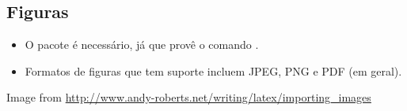 \documentclass{beamer}
\begin{document}
\subsection{Figuras}
\begin{frame}[fragile]{\insertsubsection}
\begin{itemize}
\item O pacote  é necessário, já que provê o comando
.
\item Formatos de figuras que tem suporte incluem JPEG, PNG e PDF (em geral). 
\end{itemize}

\tiny{Image from \url{http://www.andy-roberts.net/writing/latex/importing_images}}
\end{frame}
\end{document}
